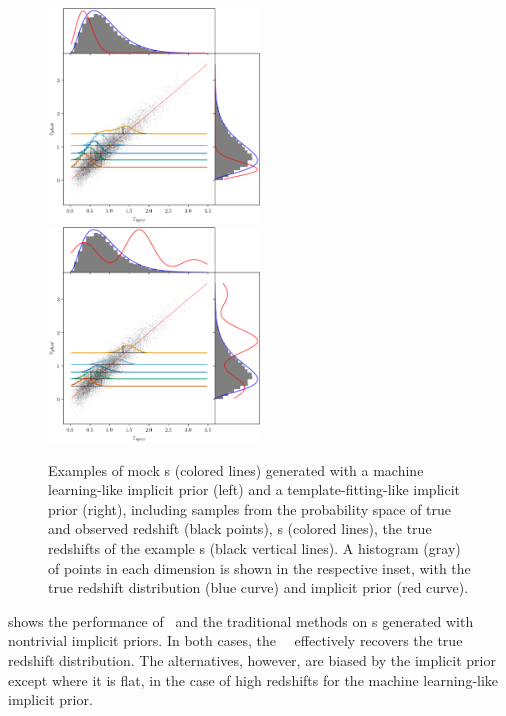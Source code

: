 \begin{figure}
	\includegraphics[width=0.5\textwidth]{figures/chippr/samplepzs_trpr.png}
	\includegraphics[width=0.5\textwidth]{figures/chippr/samplepzs_tmpr.png}
	\caption{
		Examples of mock \pzpdf s (colored lines) generated with a machine learning-like implicit prior (left) and a template-fitting-like implicit prior (right), including samples from the probability space of true and observed redshift (black points), \pzpdf s (colored lines), the true redshifts of the example \pzpdf s (black vertical lines).
		A histogram (gray) of points in each dimension is shown in the respective inset, with the true redshift distribution (blue curve) and implicit prior (red curve).
	}
\end{figure}

 shows the performance of \Chippr\ and the traditional methods on \pzpdf s generated with nontrivial implicit priors.
In both cases, the \Chippr\ \mmle\ effectively recovers the true redshift distribution.
The alternatives, however, are biased by the implicit prior except where it is flat, in the case of high redshifts for the machine learning-like implicit prior.

